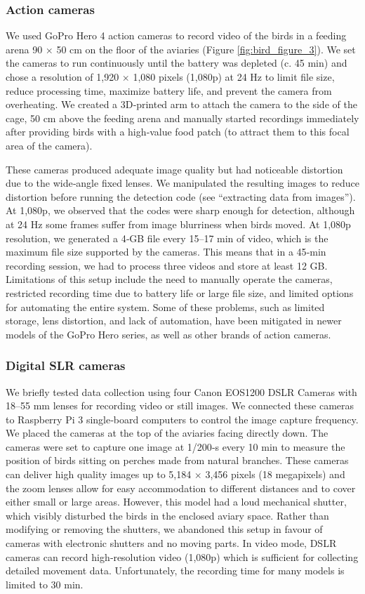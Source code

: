 \documentclass[11pt,a4paper,twoside]{book}
\begin{document}
\begin{doublespace}
\subsubsection{Action cameras}
We used GoPro Hero 4 action cameras to record video of the birds in a feeding arena 90 $\times$ 50 cm on the floor of the aviaries (Figure \ref{fig:bird_figure_3}). We set the cameras to run continuously until the battery was depleted (c. 45 min) and chose a resolution of 1,920 $\times$ 1,080 pixels (1,080p) at 24 Hz to limit file size, reduce processing time, maximize battery life, and prevent the camera from overheating. We created a 3D‐printed arm to attach the camera to the side of the cage, 50 cm above the feeding arena and manually started recordings immediately after providing birds with a high‐value food patch (to attract them to this focal area of the camera).

These cameras produced adequate image quality but had noticeable distortion due to the wide‐angle fixed lenses. We manipulated the resulting images to reduce distortion before running the detection code (see “extracting data from images”). At 1,080p, we observed that the codes were sharp enough for detection, although at 24 Hz some frames suffer from image blurriness when birds moved. At 1,080p resolution, we generated a 4‐GB file every 15–17 min of video, which is the maximum file size supported by the cameras. This means that in a 45‐min recording session, we had to process three videos and store at least 12 GB. Limitations of this setup include the need to manually operate the cameras, restricted recording time due to battery life or large file size, and limited options for automating the entire system. Some of these problems, such as limited storage, lens distortion, and lack of automation, have been mitigated in newer models of the GoPro Hero series, as well as other brands of action cameras.

\subsubsection{Digital SLR cameras}
We briefly tested data collection using four Canon EOS1200 DSLR Cameras with 18–55 mm lenses for recording video or still images. We connected these cameras to Raspberry Pi 3 single‐board computers to control the image capture frequency. We placed the cameras at the top of the aviaries facing directly down. The cameras were set to capture one image at 1/200‐s every 10 min to measure the position of birds sitting on perches made from natural branches. These cameras can deliver high quality images up to 5,184 $\times$ 3,456 pixels (18 megapixels) and the zoom lenses allow for easy accommodation to different distances and to cover either small or large areas. However, this model had a loud mechanical shutter, which visibly disturbed the birds in the enclosed aviary space. Rather than modifying or removing the shutters, we abandoned this setup in favour of cameras with electronic shutters and no moving parts. In video mode, DSLR cameras can record high‐resolution video (1,080p) which is sufficient for collecting detailed movement data. Unfortunately, the recording time for many models is limited to 30 min.


\end{doublespace}
\end{document}
